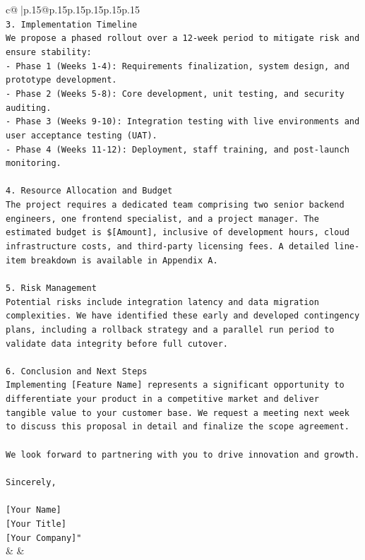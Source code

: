 \documentclass{article}
\begin{document}
{\begin{supertabular}{c@{$\;$}|p{.15\linewidth}@{}p{.15\linewidth}p{.15\linewidth}p{.15\linewidth}p{.15\linewidth}p{.15\linewidth}}
{{{\\ 
\texttt{3. Implementation Timeline} \\
\texttt{We propose a phased rollout over a 12{-}week period to mitigate risk and ensure stability:} \\
\texttt{{-} Phase 1 (Weeks 1{-}4): Requirements finalization, system design, and prototype development.} \\
\texttt{{-} Phase 2 (Weeks 5{-}8): Core development, unit testing, and security auditing.} \\
\texttt{{-} Phase 3 (Weeks 9{-}10): Integration testing with live environments and user acceptance testing (UAT).} \\
\texttt{{-} Phase 4 (Weeks 11{-}12): Deployment, staff training, and post{-}launch monitoring.} \\
\\ 
\texttt{4. Resource Allocation and Budget} \\
\texttt{The project requires a dedicated team comprising two senior backend engineers, one frontend specialist, and a project manager. The estimated budget is \${[}Amount{]}, inclusive of development hours, cloud infrastructure costs, and third{-}party licensing fees. A detailed line{-}item breakdown is available in Appendix A.} \\
\\ 
\texttt{5. Risk Management} \\
\texttt{Potential risks include integration latency and data migration complexities. We have identified these early and developed contingency plans, including a rollback strategy and a parallel run period to validate data integrity before full cutover.} \\
\\ 
\texttt{6. Conclusion and Next Steps} \\
\texttt{Implementing {[}Feature Name{]} represents a significant opportunity to differentiate your product in a competitive market and deliver tangible value to your customer base. We request a meeting next week to discuss this proposal in detail and finalize the scope agreement.} \\
\\ 
\texttt{We look forward to partnering with you to drive innovation and growth.} \\
\\ 
\texttt{Sincerely,} \\
\\ 
\texttt{{[}Your Name{]}} \\
\texttt{{[}Your Title{]}} \\
\texttt{{[}Your Company{]}"} \\
            }
        }
    }
    & & \\ \\


\end{supertabular}}
\end{document}
